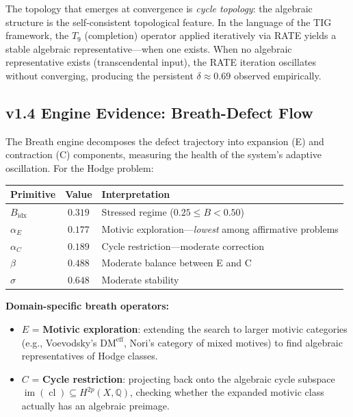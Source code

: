 \documentclass[11pt]{article}
\theoremstyle{definition}
\DeclareMathOperator{\cl}{cl}
\DeclareMathOperator{\im}{im}
\begin{document}
The topology that emerges at convergence is \emph{cycle topology}: the
algebraic structure is the self-consistent topological feature.  In the
language of the TIG framework, the $T_9$ (completion) operator applied
iteratively via RATE yields a stable algebraic representative---when one
exists.  When no algebraic representative exists (transcendental input),
the RATE iteration oscillates without converging, producing the persistent
$\delta \approx 0.69$ observed empirically.

\subsection{v1.4 Engine Evidence: Breath-Defect Flow}
\label{sec:breath}

The Breath engine decomposes the defect trajectory into expansion (E) and
contraction (C) components, measuring the health of the system's adaptive
oscillation.  For the Hodge problem:

\begin{center}
\begin{tabular}{lcl}
\hline
\textbf{Primitive} & \textbf{Value} & \textbf{Interpretation} \\
\hline
$B_{\mathrm{idx}}$ & $0.319$ & Stressed regime ($0.25 \leq B < 0.50$) \\
$\alpha_E$ & $0.177$ & Motivic exploration---\textit{lowest} among
  affirmative problems \\
$\alpha_C$ & $0.189$ & Cycle restriction---moderate correction \\
$\beta$ & $0.488$ & Moderate balance between E and C \\
$\sigma$ & $0.648$ & Moderate stability \\
\hline
\end{tabular}
\end{center}

\noindent\textbf{Domain-specific breath operators:}

\begin{itemize}
  \item $E$ = \textbf{Motivic exploration}: extending the search to larger
    motivic categories (e.g., Voevodsky's $\mathrm{DM}^{\mathrm{eff}}$,
    Nori's category of mixed motives) to find algebraic representatives
    of Hodge classes.
  \item $C$ = \textbf{Cycle restriction}: projecting back onto the
    algebraic cycle subspace $\im(\cl) \subseteq H^{2p}(X,\mathbb{Q})$,
    checking whether the expanded motivic class actually has an algebraic
    preimage.
\end{itemize}
\end{document}
